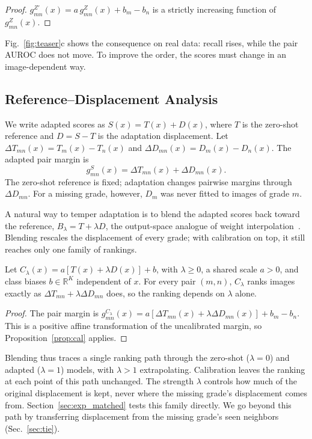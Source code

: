 \begin{proof}
$g_{mn}^{Z'}(x)=a\,g_{mn}^{Z}(x)+b_m-b_n$ is a strictly increasing function of $g_{mn}^{Z}(x)$.
\end{proof}

Fig.~\ref{fig:teaser}c shows the consequence on real data: recall rises, while the pair AUROC does not move.
To improve the order, the scores must change in an image-dependent way.

\subsection{Reference--Displacement Analysis}

We write adapted scores as $S(x)=T(x)+D(x)$, where $T$ is the zero-shot reference and $D=S-T$ is the adaptation displacement.
Let $\Delta T_{mn}(x)=T_m(x)-T_n(x)$ and $\Delta D_{mn}(x)=D_m(x)-D_n(x)$.
The adapted pair margin is
\begin{equation}
  g^S_{mn}(x)=\Delta T_{mn}(x)+\Delta D_{mn}(x).
  \label{eq:margin_decomposition}
\end{equation}
The zero-shot reference is fixed; adaptation changes pairwise margins through $\Delta D_{mn}$.
For a missing grade, however, $D_m$ was never fitted to images of grade $m$.

A natural way to temper adaptation is to blend the adapted scores back toward the reference, $B_\lambda=T+\lambda D$, the output-space analogue of weight interpolation~\cite{wortsman2022robust}.
Blending rescales the displacement of every grade; with calibration on top, it still reaches only one family of rankings.

\begin{proposition}
\label{prop:family}
Let $C_\lambda(x)=a[T(x)+\lambda D(x)]+b$, with $\lambda\ge0$, a shared scale $a>0$, and class biases $b\in\mathbb R^K$ independent of $x$.
For every pair $(m,n)$, $C_\lambda$ ranks images exactly as $\Delta T_{mn}+\lambda\Delta D_{mn}$ does, so the ranking depends on $\lambda$ alone.
\end{proposition}

\begin{proof}
The pair margin is
$g_{mn}^{C_\lambda}(x)
=a[\Delta T_{mn}(x)+\lambda\Delta D_{mn}(x)]
+b_m-b_n$.
This is a positive affine transformation of the uncalibrated margin, so Proposition~\ref{prop:cal} applies.
\end{proof}

Blending thus traces a single ranking path through the zero-shot ($\lambda=0$) and adapted ($\lambda=1$) models, with $\lambda>1$ extrapolating.
Calibration leaves the ranking at each point of this path unchanged.
The strength $\lambda$ controls how much of the original displacement is kept, never where the missing grade's displacement comes from.
Section~\ref{sec:exp_matched} tests this family directly.
We go beyond this path by transferring displacement from the missing grade's seen neighbors (Sec.~\ref{sec:tie}).
